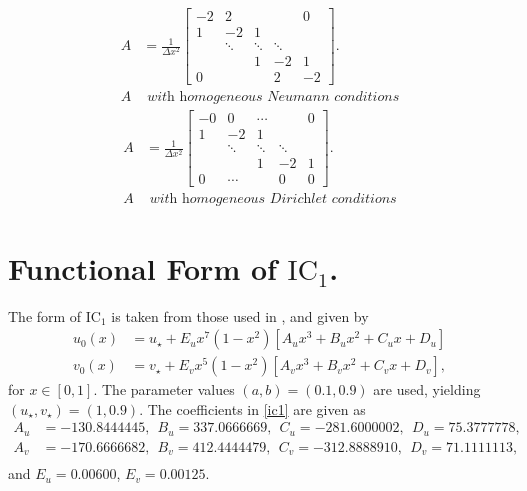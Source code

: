 \begin{multicols}{2}
\begin{equation}\label{Aneumann}
    \begin{split}
A&=\frac{1}{\Delta x^2}\begin{bmatrix}
   -2&  2&  &  & 0\\
   1&  -2&  1&  & \\
   &  \ddots&  \ddots&  \ddots& \\
   &  &  1&  -2& 1\\
   0&  &  &  2& -2
  \end{bmatrix}.\\
  A &\textit{ with homogeneous Neumann conditions}
    \end{split}
\end{equation}
\break
\begin{equation}\label{Adirichlet}
    \begin{split}
A&=\frac{1}{\Delta x^2}\begin{bmatrix}
   -0&  0& \cdots &  & 0\\
   1&  -2&  1&  & \\
   &  \ddots&  \ddots&  \ddots& \\
   &  &  1&  -2& 1\\
   0&\cdots  &  &  0& 0
  \end{bmatrix}.\\
  A & \textit{ with homogeneous Dirichlet conditions}
    \end{split}
\end{equation}
\end{multicols}


\section{Functional Form of $\text{IC}_1$.}
The form of $\text{IC}_1$ is taken from those used in \cite{gaffmonk}, and given by
\begin{equation}\label{ic1}
    \begin{split}
    u_0(x)&=u_\star+E_ux^7(1-x^2)[A_ux^3+B_ux^2+C_ux+D_u]\\
    v_0(x)&=v_\star+E_vx^5(1-x^2)[A_vx^3+B_vx^2+C_vx+D_v],
    \end{split}
\end{equation}
for $x\in[0,1]$. The parameter values $(a,b)=(0.1,0.9)$ are used, yielding $(u_\star,v_\star)=(1,0.9)$. The coefficients in \eqref{ic1} are given as
\begin{align*}
A_u&=-130.8444445,\ \ B_u=337.0666669,\ \ C_u=-281.6000002,\ \ D_u=75.3777778,\\
A_v&=-170.6666682,\ \ B_v=412.4444479,\ \ C_v=-312.8888910,\ \ D_v=71.1111113,\\
\end{align*}
and $E_u=0.00600$, $E_v=0.00125$.



